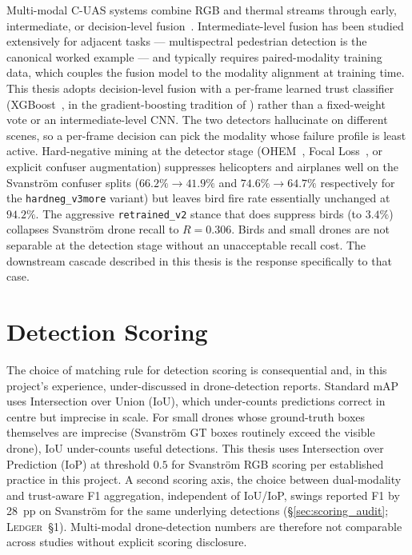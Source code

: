 \documentclass[12pt,a4paper,oneside,openright]{book}
\begin{document}
Multi-modal C-UAS systems combine RGB and thermal streams through early, intermediate, or decision-level fusion~\cite{ramachandram2017fusion}. Intermediate-level fusion has been studied extensively for adjacent tasks --- multispectral pedestrian detection \cite{wagner2016multispectral} is the canonical worked example --- and typically requires paired-modality training data, which couples the fusion model to the modality alignment at training time. This thesis adopts decision-level fusion with a per-frame learned trust classifier (XGBoost~\cite{chen2016xgboost}, in the gradient-boosting tradition of \citet{friedman2001greedy}) rather than a fixed-weight vote or an intermediate-level CNN. The two detectors hallucinate on different scenes, so a per-frame decision can pick the modality whose failure profile is least active. Hard-negative mining at the detector stage (OHEM~\cite{shrivastava2016ohem}, Focal Loss~\cite{lin2017focal}, or explicit confuser augmentation) suppresses helicopters and airplanes well on the Svanstr\"om confuser splits ($66.2\% \to 41.9\%$ and $74.6\% \to 64.7\%$ respectively for the \texttt{hardneg\_v3more} variant) but leaves bird fire rate essentially unchanged at $94.2\%$. The aggressive \texttt{retrained\_v2} stance that does suppress birds (to $3.4\%$) collapses Svanstr\"om drone recall to $R=0.306$. Birds and small drones are not separable at the detection stage without an unacceptable recall cost. The downstream cascade described in this thesis is the response specifically to that case.

\section{Detection Scoring}
\label{sec:lit_calibration}

The choice of matching rule for detection scoring is consequential and, in this project's experience, under-discussed in drone-detection reports. Standard mAP uses Intersection over Union (IoU), which under-counts predictions correct in centre but imprecise in scale. For small drones whose ground-truth boxes themselves are imprecise (Svanstr\"om GT boxes routinely exceed the visible drone), IoU under-counts useful detections. This thesis uses Intersection over Prediction (IoP) at threshold $0.5$ for Svanstr\"om RGB scoring per established practice in this project. A second scoring axis, the choice between dual-modality and trust-aware F1 aggregation, independent of IoU/IoP, swings reported F1 by 28~pp on Svanstr\"om for the same underlying detections (\S\ref{sec:scoring_audit}; \textsc{Ledger}~\S1). Multi-modal drone-detection numbers are therefore not comparable across studies without explicit scoring disclosure.
\end{document}
